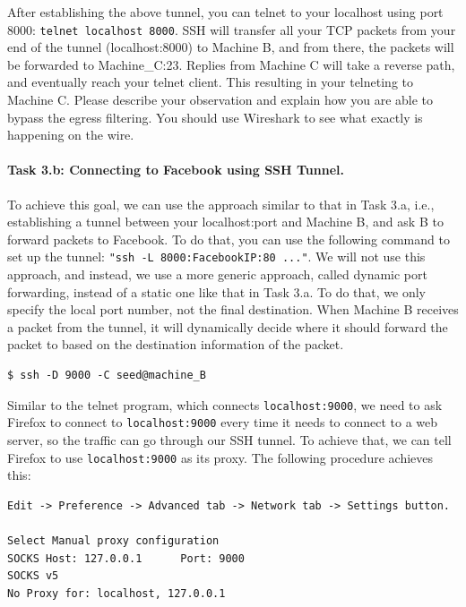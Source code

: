 After establishing the above tunnel, you can telnet to your localhost
using port 8000: {\tt telnet localhost 8000}.
SSH will transfer all your TCP packets from
your end of the tunnel (localhost:8000) to Machine B, and from there,
the packets will be forwarded to Machine\_C:23. Replies from Machine C will
take a reverse path, and eventually reach your telnet client.
This resulting in your telneting to Machine C.
Please describe your observation and explain how you are able to 
bypass the egress filtering. You should use Wireshark to see
what exactly is happening on the wire.





\paragraph{Task 3.b: Connecting to Facebook using SSH Tunnel.}
To achieve this goal, we can use the approach similar to that in 
Task 3.a, i.e., establishing a tunnel between your localhost:port
and Machine B, and ask B to forward packets to Facebook. To do 
that, you can use the following command to set up the tunnel:
{\tt "ssh -L 8000:FacebookIP:80 ..."}. 
We will not use this approach, and instead, we 
use a more generic approach, called dynamic port forwarding, instead of a static one
like that in Task 3.a. To do that, we only specify the local
port number, not the final destination. When Machine B receives
a packet from the tunnel, it will dynamically decide where it should 
forward the packet to based on the destination information of
the packet.
\begin{Verbatim}[frame=single] 
$ ssh -D 9000 -C seed@machine_B
\end{Verbatim}


Similar to the telnet program, which connects {\tt localhost:9000}, 
we need to ask Firefox to connect to {\tt localhost:9000} every time it 
needs to connect to a web server, so the traffic can 
go through our SSH tunnel. To achieve that, we can tell Firefox to
use {\tt localhost:9000} as its proxy. The following procedure
achieves this:
\begin{Verbatim}[frame=single] 
Edit -> Preference -> Advanced tab -> Network tab -> Settings button.

Select Manual proxy configuration
SOCKS Host: 127.0.0.1      Port: 9000
SOCKS v5
No Proxy for: localhost, 127.0.0.1
\end{Verbatim}

